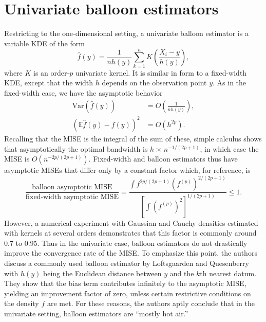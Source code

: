 \documentclass{article}
\newcommand{\E}{\mathbb{E}}
\newcommand{\var}[1]{\text{Var}\left(#1\right)}
\begin{document}
\section{Univariate balloon estimators}
Restricting to the one-dimensional setting, a univariate balloon estimator is a variable KDE of the form 
\begin{equation}\label{eq:balloon1}
    \hat{f}(y) = \frac{1}{nh(y)} \sum_{k=1}^n K\left(\frac{X_i-y}{h(y)}\right), 
\end{equation}
where $K$ is an order-$p$ univariate kernel. It is similar in form to a fixed-width KDE, except that the width $h$ depends on the observation point $y$. As in the fixed-width case, we have the asymptotic behavior
\begin{align}
    \var{\hat{f}(y)} &= O\left(\frac{1}{nh(y)}\right), \label{eq:ub-var} \\
    \left( \E \hat{f}(y) - f(y) \right)^2 &= O\left(h^{2p}\right). \label{eq:ub-bias}
\end{align}
Recalling that the MISE is the integral of the sum of these, simple calculus shows that asymptotically the optimal bandwidth is $h \asymp n^{-1/(2p+1)}$, in which case the MISE is $O\left(n^{-2p/(2p+1)}\right)$. Fixed-width and balloon estimators thus have asymptotic MISEs that differ only by a constant factor which, for reference, is 
\begin{equation}\label{eq:ub-compare}
    \frac{\text{balloon asymptotic MISE}}{\text{fixed-width asymptotic MISE}} = \dfrac{\displaystyle\int f^{2p/(2p+1)} (f^{(p)})^{2/(2p+1)}}{\left[ \displaystyle\int (f^{(p)})^2 \right]^{1/(2p+1)}} \leq 1. 
\end{equation}
 However, a numerical experiment with Gaussian and Cauchy densities estimated with kernels at several orders demonstrates that this factor is commonly around 0.7 to 0.95. Thus in the univariate case, balloon estimators do not drastically improve the convergence rate of the MISE. To emphasize this point, the authors discuss a commonly used balloon estimator by Loftsgaarden and Quesenberry with $h(y)$ being the Euclidean distance between $y$ and the $k$th nearest datum. They show that the bias term contributes infinitely to the asymptotic MISE, yielding an improvement factor of zero, unless certain restrictive conditions on the density $f$ are met. For these reasons, the authors aptly conclude that in the univariate setting, balloon estimators are ``mostly hot air.''
\end{document}
